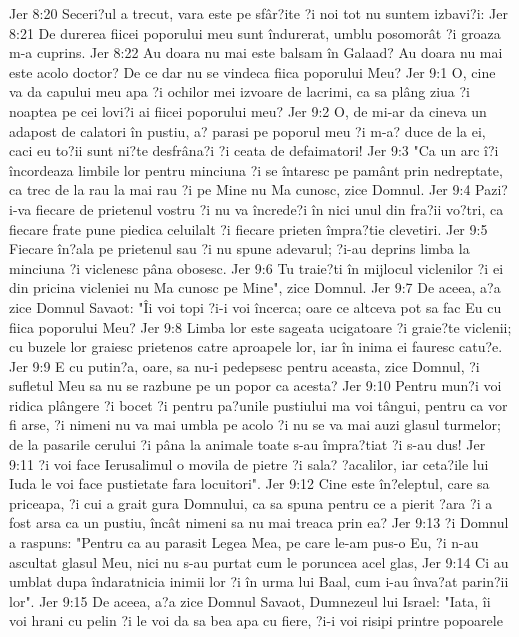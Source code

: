 Jer 8:20  Seceri?ul a trecut, vara este pe sfâr?ite ?i noi tot nu suntem izbavi?i:
Jer 8:21  De durerea fiicei poporului meu sunt îndurerat, umblu posomorât ?i groaza m-a cuprins.
Jer 8:22  Au doara nu mai este balsam în Galaad? Au doara nu mai este acolo doctor? De ce dar nu se vindeca fiica poporului Meu?
Jer 9:1  O, cine va da capului meu apa ?i ochilor mei izvoare de lacrimi, ca sa plâng ziua ?i noaptea pe cei lovi?i ai fiicei poporului meu?
Jer 9:2  O, de mi-ar da cineva un adapost de calatori în pustiu, a? parasi pe poporul meu ?i m-a? duce de la ei, caci eu to?ii sunt ni?te desfrâna?i ?i ceata de defaimatori!
Jer 9:3  "Ca un arc î?i încordeaza limbile lor pentru minciuna ?i se întaresc pe pamânt prin nedreptate, ca trec de la rau la mai rau ?i pe Mine nu Ma cunosc, zice Domnul.
Jer 9:4  Pazi?i-va fiecare de prietenul vostru ?i nu va încrede?i în nici unul din fra?ii vo?tri, ca fiecare frate pune piedica celuilalt ?i fiecare prieten împra?tie clevetiri.
Jer 9:5  Fiecare în?ala pe prietenul sau ?i nu spune adevarul; ?i-au deprins limba la minciuna ?i viclenesc pâna obosesc.
Jer 9:6  Tu traie?ti în mijlocul viclenilor ?i ei din pricina vicleniei nu Ma cunosc pe Mine", zice Domnul.
Jer 9:7  De aceea, a?a zice Domnul Savaot: "Îi voi topi ?i-i voi încerca; oare ce altceva pot sa fac Eu cu fiica poporului Meu?
Jer 9:8  Limba lor este sageata ucigatoare ?i graie?te viclenii; cu buzele lor graiesc prietenos catre aproapele lor, iar în inima ei fauresc catu?e.
Jer 9:9  E cu putin?a, oare, sa nu-i pedepsesc pentru aceasta, zice Domnul, ?i sufletul Meu sa nu se razbune pe un popor ca acesta?
Jer 9:10  Pentru mun?i voi ridica plângere ?i bocet ?i pentru pa?unile pustiului ma voi tângui, pentru ca vor fi arse, ?i nimeni nu va mai umbla pe acolo ?i nu se va mai auzi glasul turmelor; de la pasarile cerului ?i pâna la animale toate s-au împra?tiat ?i s-au dus!
Jer 9:11  ?i voi face Ierusalimul o movila de pietre ?i sala? ?acalilor, iar ceta?ile lui Iuda le voi face pustietate fara locuitori".
Jer 9:12  Cine este în?eleptul, care sa priceapa, ?i cui a grait gura Domnului, ca sa spuna pentru ce a pierit ?ara ?i a fost arsa ca un pustiu, încât nimeni sa nu mai treaca prin ea?
Jer 9:13  ?i Domnul a raspuns: "Pentru ca au parasit Legea Mea, pe care le-am pus-o Eu, ?i n-au ascultat glasul Meu, nici nu s-au purtat cum le poruncea acel glas,
Jer 9:14  Ci au umblat dupa îndaratnicia inimii lor ?i în urma lui Baal, cum i-au înva?at parin?ii lor".
Jer 9:15  De aceea, a?a zice Domnul Savaot, Dumnezeul lui Israel: "Iata, îi voi hrani cu pelin ?i le voi da sa bea apa cu fiere, ?i-i voi risipi printre popoarele
